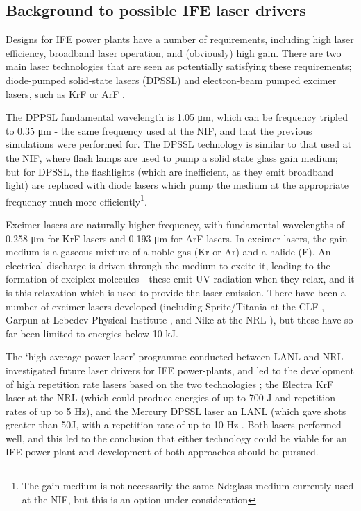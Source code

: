 \subsection{Background to possible IFE laser drivers}

Designs for IFE power plants have a number of requirements, including high laser efficiency, broadband laser operation, and (obviously) high gain. There are two main laser technologies that are seen as potentially satisfying these requirements; diode-pumped solid-state lasers (DPSSL) and electron-beam pumped excimer lasers, such as KrF or ArF \cite{Craxton2015}. 

The DPPSL fundamental wavelength is 1.05 \unit{\micro\meter}, which can be frequency tripled to 0.35 \unit{\micro\meter} - the same frequency used at the NIF, and that the previous simulations were performed for. The DPSSL technology is similar to that used at the NIF, where flash lamps are used to pump a solid state glass gain medium; but for DPSSL, the flashlights (which are inefficient, as they emit broadband light) are replaced with diode lasers which pump the medium at the appropriate frequency much more efficiently\footnote{The gain medium is not necessarily the same Nd:glass medium currently used at the NIF, but this is an option under consideration}. 

Excimer lasers are naturally higher frequency, with fundamental wavelengths of 0.258 \unit{\micro\meter} for KrF lasers and 0.193 \unit{\micro\meter} for ArF lasers. In excimer lasers, the gain medium is a gaseous mixture of a noble gas (Kr or Ar) and a halide (F). An electrical discharge is driven through the medium to excite it, leading to the formation of exciplex molecules - these emit UV radiation when they relax, and it is this relaxation which is used to provide the laser emission. There have been a number of excimer lasers developed (including Sprite/Titania at the CLF \cite{Divall1996}, Garpun at Lebedev Physical Institute \cite{Zvorykin2006}, and Nike at the NRL \cite{Obenschain1996}), but these have so far been limited to energies below 10 kJ. 

The `high average power laser' programme conducted between LANL and NRL investigated future laser drivers for IFE power-plants, and led to the development of high repetition rate lasers based on the two technologies \cite{Craxton2015}; the Electra KrF laser at the NRL (which could produce energies of up to 700 J and repetition rates of up to 5 Hz), and the Mercury DPSSL laser an LANL (which gave shots greater than 50J, with a repetition rate of up to 10 Hz \cite{Sethian2010}. Both lasers performed well, and this led to the conclusion that either technology could be viable for an IFE power plant and development of both approaches should be pursued.

